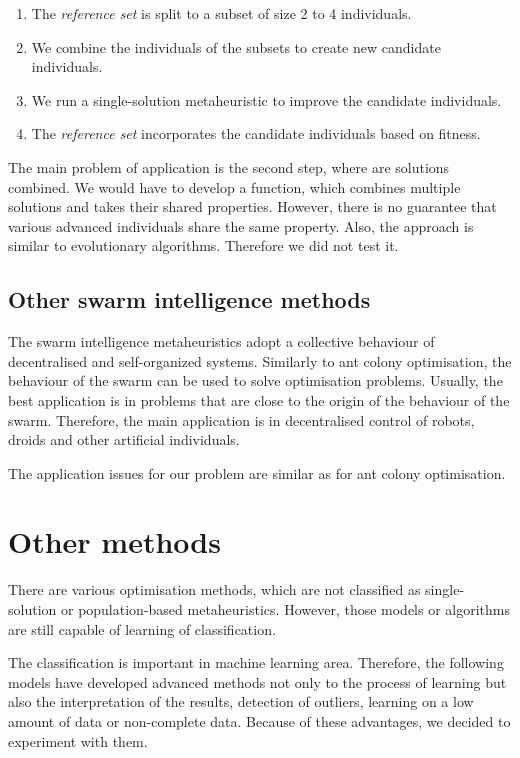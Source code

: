 \documentclass[
  print, %
  Table,   %
  nolof,     %
  nolot,     %
  11pt, %
  oneside  %
]{fithesis3}
\begin{document}
\begin{enumerate}
    \item The \textit{reference set} is split to a subset of size 2 to 4 individuals.
    \item We combine the individuals of the subsets to create new candidate individuals.
    \item We run a single-solution metaheuristic to improve the candidate individuals.
    \item The \textit{reference set} incorporates the candidate individuals based on fitness.
\end{enumerate}

The main problem of application is the second step, where are solutions combined. We would have to develop a function, which combines multiple solutions and takes their shared properties. However, there is no guarantee that various advanced individuals share the same property. Also, the approach is similar to evolutionary algorithms. Therefore we did not test it.

\subsection{Other swarm intelligence methods}
\label{subsec:opt-popul-si}

The swarm intelligence metaheuristics adopt a collective behaviour of decentralised and self-organized systems. Similarly to ant colony optimisation, the behaviour of the swarm can be used to solve optimisation problems. Usually, the best application is in problems that are close to the origin of the behaviour of the swarm. Therefore, the main application is in decentralised control of robots, droids and other artificial individuals.

The application issues for our problem are similar as for ant colony optimisation.

\section{Other methods}
\label{sec:opt-other}

There are various optimisation methods, which are not classified as single-solution or population-based metaheuristics. However, those models or algorithms are still capable of learning of classification.

The classification is important in machine learning area. Therefore, the following models have developed advanced methods not only to the process of learning but also the interpretation of the results, detection of outliers, learning on a low amount of data or non-complete data. Because of these advantages, we decided to experiment with them.
\end{document}
